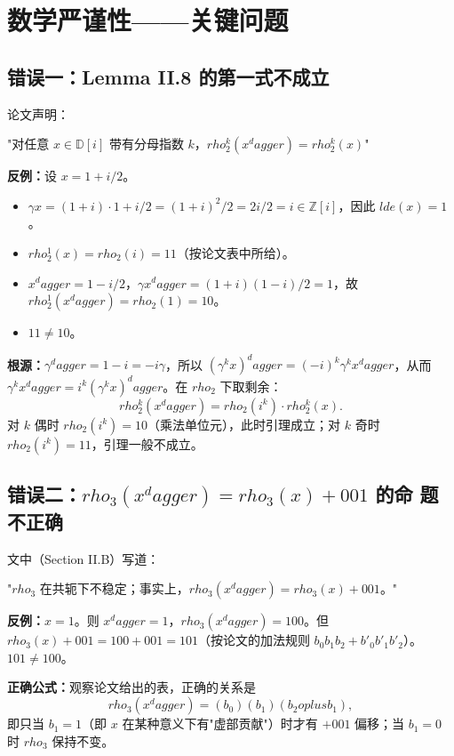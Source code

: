 \documentclass[10pt,a4paper]{article}
\def\rho{rho}%
\def\dagger{dagger}%
\def\oplus{oplus}%
\def\mathrm#1{#1}%
\def\tfrac#1#2{#1/#2}%
\begin{document}
\section{数学严谨性——关键问题}
 
\subsection{错误一：Lemma II.8 的第一式不成立}
 
论文声明：
 
"对任意 $x \in \mathbb{D}[i]$ 带有分母指数 $k$，$\rho_2^k(x^\dagger) = \rho_2^k(x)$"
 
\textbf{反例：}设 $x = \tfrac{1+i}{2}$。
\begin{itemize}
\item $\gamma x = (1+i) \cdot \tfrac{1+i}{2} = \tfrac{(1+i)^2}{2} = \tfrac{2i}{2} = i \in \mathbb{Z}[i]$，因此 $\mathrm{lde}(x) = 1$。
\item $\rho_2^1(x) = \rho_2(i) = 11$（按论文表中所给）。
\item $x^\dagger = \tfrac{1-i}{2}$，$\gamma x^\dagger = (1+i)(1-i)/2 = 1$，故 $\rho_2^1(x^\dagger) = \rho_2(1) = 10$。
\item $11 \neq 10$。
\end{itemize}
 
\textbf{根源：}$\gamma^\dagger = 1-i = -i\gamma$，所以 $(\gamma^k x)^\dagger = (-i)^k \gamma^k x^\dagger$，从而 $\gamma^k x^\dagger = i^k (\gamma^k x)^\dagger$。在 $\rho_2$ 下取剩余：
\[
\rho_2^k(x^\dagger) = \rho_2(i^k) \cdot \rho_2^k(x).
\]
对 $k$ 偶时 $\rho_2(i^k) = 10$（乘法单位元），此时引理成立；对 $k$ 奇时 $\rho_2(i^k) = 11$，引理一般不成立。
 
\subsection{错误二：$\rho_3(x^\dagger) = \rho_3(x) + 001$ 的命
  题不正确}
 
文中（Section II.B）写道：
 
"$\rho_3$ 在共轭下不稳定；事实上，$\rho_3(x^\dagger) = \rho_3(x) + 001$。"
 
\textbf{反例：}$x = 1$。则 $x^\dagger = 1$，$\rho_3(x^\dagger) = 100$。但 $\rho_3(x) + 001 = 100 + 001 = 101$（按论文的加法规则 $b_0b_1b_2 + b'_0b'_1b'_2$）。$101 \neq 100$。
 
\textbf{正确公式：}观察论文给出的表，正确的关系是
\[
\rho_3(x^\dagger) = (b_0)(b_1)(b_2 \oplus b_1),
\]
即只当 $b_1 = 1$（即 $x$ 在某种意义下有"虚部贡献"）时才有 $+001$ 偏移；当 $b_1 = 0$ 时 $\rho_3$ 保持不变。
 
\end{document}
